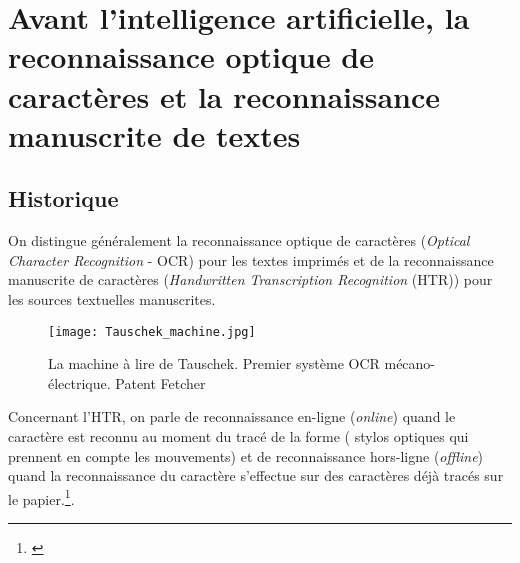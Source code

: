\section{Avant l'intelligence artificielle, la reconnaissance optique de caractères et la reconnaissance manuscrite de textes}\label{Histoire_fonctionnement_HTR}

\subsection{Historique}

On distingue généralement la reconnaissance optique de caractères (\textit{Optical Character Recognition} - OCR)
pour les textes imprimés et de la reconnaissance manuscrite de caractères (\textit{Handwritten Transcription Recognition} (HTR)) pour les sources textuelles manuscrites.\\

\begin{wrapfigure}[14]{r}{9cm}
    \centering
    \texttt{[image: Tauschek\_machine.jpg]}
    \caption{La machine à lire de Tauschek. Premier système OCR mécano-électrique. \textcopyright Patent Fetcher}
    \label{fig:tauschek_machine}
\end{wrapfigure}

Concernant l'HTR, on parle de reconnaissance en-ligne (\textit{online}) quand le caractère est reconnu au moment du tracé de la forme ( stylos optiques qui prennent en compte les mouvements) et de reconnaissance hors-ligne (\textit{offline}) quand la reconnaissance du caractère s'effectue sur des caractères déjà tracés sur le papier.\footnote{\cite{eikvil_ocr_1993}}. \\

